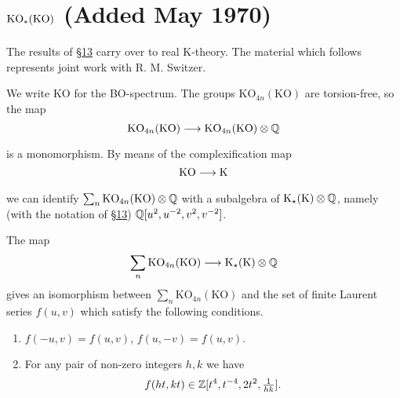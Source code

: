 \documentclass[../main]{subfiles}
\begin{document}
\label{sec:p2c17}

\chapter{\texorpdfstring{$\mathrm{KO}_\ast(\mathrm{KO})$}{KO(KO)} (Added May 1970)} %

The results of \hyperref[sec:p2c13]{\S13} carry over to real K-theory. The material which follows represents joint work with R. M. Switzer.

We write $\mathrm{KO}$ for the BO-spectrum. The groups $\mathrm{KO}_{4n}(\mathrm{KO})$ are torsion-free, so the map
\[
\mathrm{KO}_{4n}(\mathrm{KO})
\lar{}
\mathrm{KO}_{4n}(\mathrm{KO}) \otimes \bbQ %
\]
is a monomorphism. By means of the complexification map
\[
\mathrm{KO}\lar{} \mathrm K
\]
we can identify $\sum_n \mathrm{KO}_{4n}(\mathrm{KO}) \otimes \mathbb{Q}$ with a subalgebra of $\mathrm K_\star(\mathrm K) \otimes \mathbb{Q}$, namely (with the notation of \hyperref[sec:p2c13]{\S 13}) $\mathbb{Q}[u^2,u^{-2},v^2,v^{-2}]$.

\begin{theorem} \label{thm:p2c17.1}
The map
\[
\sum_n \mathrm{KO}_{4n}(\mathrm{KO})
\lar{}
\mathrm K_\star(\mathrm K) \otimes \bbQ
\]
gives an isomorphism between $\sum_n \mathrm{KO}_{4n}(\mathrm{KO})$ and the set of finite Laurent series $f(u,v)$ which satisfy the following conditions.
    \begin{enumerate}[label=(\thechapter.\arabic*), start=2]
        \item \label{part 2 condition 17.2}
        $f(-u,v)=f(u,v)$, $f(u,-v)=f(u,v)$.
        \item \label{part 2 condition 17.3}
        For any pair of non-zero integers $h,k$ we have
        \[
        f(ht,kt)\in \mathbb{Z}[t^4,t^{-4},2t^2, \tfrac{1}{hk}].
        \]
    \end{enumerate}
\end{theorem}
\end{document}
